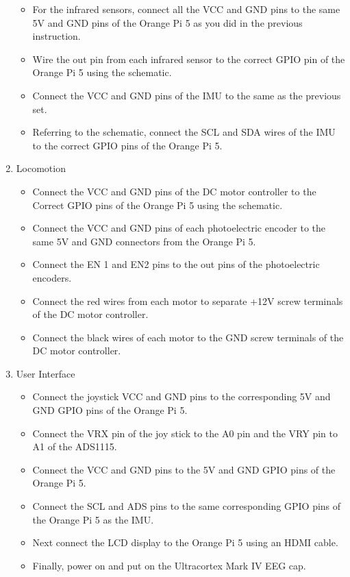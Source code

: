 \documentclass[conference]{IEEEtran}
\begin{document}
\begin{enumerate}
\begin{itemize}
            \item For the infrared sensors, connect all the VCC and GND pins to the same 5V and GND pins of the Orange Pi 5 as you did in the previous instruction.
            \item Wire the out pin from each infrared sensor to the correct GPIO pin of the Orange Pi 5 using the schematic.
            \item Connect the VCC and GND pins of the IMU to the same as the previous set.
            \item Referring to the schematic, connect the SCL and SDA wires of the IMU to the correct GPIO pins of the Orange Pi 5.
        \end{itemize}
        \item Locomotion
        \begin{itemize}
            \item Connect the VCC and GND pins of the DC motor controller to the Correct GPIO pins of the Orange Pi 5 using the schematic.
            \item Connect the VCC and GND pins of each photoelectric encoder to the same 5V and GND connectors from the Orange Pi 5. 
            \item Connect the EN 1 and EN2 pins to the out pins of the photoelectric encoders.
            \item Connect the red wires from each motor to separate +12V screw terminals of the DC motor controller.
            \item Connect the black wires of each motor to the GND screw terminals of the DC motor controller.
        \end{itemize}
        \item User Interface
        \begin{itemize}
            \item Connect the joystick VCC and GND pins to the corresponding 5V and GND GPIO pins of the Orange Pi 5.
            \item Connect the VRX pin of the joy stick to the A0 pin and the VRY pin to A1 of the ADS1115. 
            \item Connect the VCC and GND pins to the 5V and GND GPIO pins of the Orange Pi 5.
            \item Connect the SCL and ADS pins to the same corresponding GPIO pins of the Orange Pi 5 as the IMU.
            \item Next connect the LCD display to the Orange Pi 5 using an HDMI cable.
            \item Finally, power on and put on the Ultracortex Mark IV EEG cap.
        \end{itemize}
    \end{enumerate}
    
\end{document}
